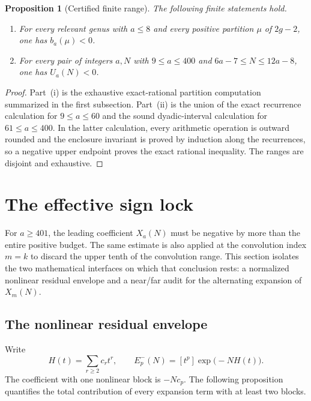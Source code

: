 \documentclass[11pt]{article}
\newtheorem{proposition}[theorem]{Proposition}
\theoremstyle{definition}
\theoremstyle{remark}
\begin{document}
\begin{proposition}[Certified finite range]\label{prop:finite-range}
The following finite statements hold.
\begin{enumerate}[label=\textup{(\roman*)},leftmargin=2.2em]
\item For every relevant genus with $a\le8$ and every positive partition
$\mu$ of $2g-2$, one has $b_a(\mu)<0$.
\item For every pair of integers $a,N$ with $9\le a\le400$ and
$6a-7\le N\le12a-8$, one has $U_a(N)<0$.
\end{enumerate}
\end{proposition}

\begin{proof}
Part~\textup{(i)} is the exhaustive exact-rational partition computation
summarized in the first subsection.  Part~\textup{(ii)} is the union of the
exact recurrence calculation for $9\le a\le60$ and the sound dyadic-interval
calculation for $61\le a\le400$.  In the latter calculation, every arithmetic
operation is outward rounded and the enclosure invariant is proved by
induction along the recurrences, so a negative upper endpoint proves the exact
rational inequality.  The ranges are disjoint and exhaustive.
\end{proof}

\section{The effective sign lock}\label{sec:signlock}

For $a\ge401$, the leading coefficient $X_a(N)$ must be negative by more than
the entire positive budget.  The same estimate is also applied at the
convolution index $m=k$ to discard the upper tenth of the convolution range.
This section isolates the two mathematical interfaces on which that conclusion
rests: a normalized nonlinear residual envelope and a near/far audit for the
alternating expansion of $X_m(N)$.

\subsection{The nonlinear residual envelope}\label{subsec:envelope}

Write
\[
  H(t)=\sum_{r\ge2}c_rt^r,
  \qquad
  E^-_p(N)=[t^p]\exp\!\bigl(-NH(t)\bigr).
\]
The coefficient with one nonlinear block is $-Nc_p$.  The following proposition
quantifies the total contribution of every expansion term with at least two
blocks.
\end{document}
